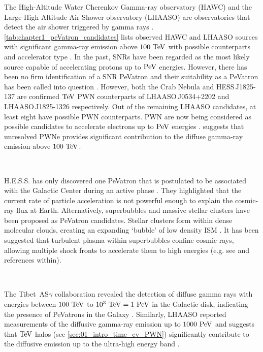 The High-Altitude Water Cherenkov Gamma-ray observatory (HAWC) and the Large High Altitude Air Shower observatory (LHAASO) are observatories that detect the air shower triggered by gamma rays \citep{LHAASO_website, HAWC}. \autoref{tab:chapter1_peVatron_candidates} lists observed HAWC and LHAASO sources with significant gamma-ray emission above $100~\TeV$ with possible counterparts and accelerator type \citep{PhysRevLett.124.021102,2021Natur.594...33C}. In the past, SNRs have been regarded as the most likely source capable of accelerating protons up to $\PeV$ energies. However, there has been no firm identification of a SNR PeVatron and their suitability as a PeVatron has been called into question \citep{10.1093/mnras/sty1589,2019IJMPD..2830022G,2021Univ....7..324C,2022MNRAS.516..492B}. However, both the Crab Nebula and \mbox{HESS\,J1825-137} are confirmed $\TeV$ PWN counterparts of \mbox{LHAASO\,J0534+2202} and \mbox{LHAASO\,J1825-1326} respectively. Out of the remaining LHAASO candidates, at least eight have possible PWN counterparts. PWN are now being considered as possible candidates to accelerate electrons up to $\PeV$ energies \citep{2021ApJ...908L..49B,de_O_a_Wilhelmi_2022}. \cite{2022ApJ...928...19V} suggests that unresolved PWNe provides significant contribution to the diffuse gamma-ray emission above $100~\TeV$.
\par~\par
H.E.S.S. has only discovered one PeVatron that is postulated to be associated with the Galactic Center during an active phase \cite{2016Natur.531..476H}. They highlighted that the current rate of particle acceleration is not powerful enough to explain the cosmic-ray flux at Earth.  Alternatively, superbubbles and massive stellar clusters have been proposed as PeVatron candidates. Stellar clusters form within dense molecular clouds, creating an expanding `bubble' of low density ISM \citep{1998LNP...506..399I}. It has been suggested that turbulent plasma within superbubbles confine cosmic rays, allowing multiple shock fronts to accelerate them to high energies (e.g. see \cite{2022MNRAS.515.2256V} and references within).
\par~\par 
The \mbox{Tibet AS$\gamma$} collaboration revealed the detection of diffuse gamma rays with energies between $100~\TeV$ to $10^3~\TeV=1~\PeV$ in the Galactic disk, indicating the presence of PeVatrons in the Galaxy \citep{PhysRevLett.126.141101}. Similarly, LHAASO reported measurements of the diffusive gamma-ray emission up to $1000~\PeV$ and suggests that $\TeV$ halos (see \autoref{sec:01_intro_time_ev_PWN}) significantly contribute to the diffusive emission up to the ultra-high energy band \citep{2023arXiv230505372C}.

